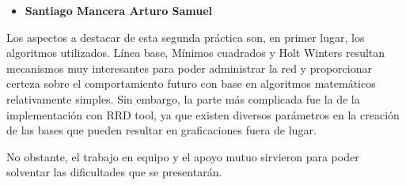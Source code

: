 \begin{itemize}
\item \textbf{Santiago Mancera Arturo Samuel}
\end{itemize}

Los aspectos a destacar de esta segunda práctica son, en primer lugar, los algoritmos utilizados. Línea base, Mínimos cuadrados y Holt Winters resultan mecanismos muy interesantes para poder administrar la red y proporcionar certeza sobre el comportamiento futuro con base en algoritmos matemáticos relativamente simples. Sin embargo, la parte más complicada fue la de la implementación con RRD tool, ya que existen diversos parámetros en la creación de las bases que pueden resultar en graficaciones fuera de lugar.

No obstante, el trabajo en equipo y el apoyo mutuo sirvieron para poder solventar las dificultades que se presentarán.